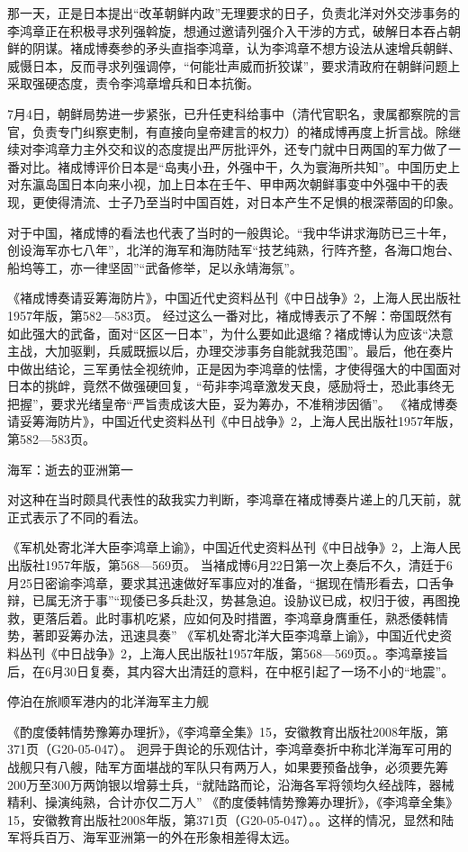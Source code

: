 \documentclass[12pt,UTF8]{ctexbook}
\begin{document}
那一天，正是日本提出“改革朝鲜内政”无理要求的日子，负责北洋对外交涉事务的李鸿章正在积极寻求列强斡旋，想通过邀请列强介入干涉的方式，破解日本吞占朝鲜的阴谋。褚成博奏参的矛头直指李鸿章，认为李鸿章不想方设法从速增兵朝鲜、威慑日本，反而寻求列强调停，“何能壮声威而折狡谋”，要求清政府在朝鲜问题上采取强硬态度，责令李鸿章增兵和日本抗衡。

7月4日，朝鲜局势进一步紧张，已升任吏科给事中（清代官职名，隶属都察院的言官，负责专门纠察吏制，有直接向皇帝建言的权力）的褚成博再度上折言战。除继续对李鸿章力主外交和议的态度提出严厉批评外，还专门就中日两国的军力做了一番对比。褚成博评价日本是“岛夷小丑，外强中干，久为寰海所共知”。中国历史上对东瀛岛国日本向来小视，加上日本在壬午、甲申两次朝鲜事变中外强中干的表现，更使得清流、士子乃至当时中国百姓，对日本产生不足惧的根深蒂固的印象。

对于中国，褚成博的看法也代表了当时的一般舆论。“我中华讲求海防已三十年，创设海军亦七八年”，北洋的海军和海防陆军“技艺纯熟，行阵齐整，各海口炮台、船坞等工，亦一律坚固”“武备修举，足以永靖海氛”。

《褚成博奏请妥筹海防片》，中国近代史资料丛刊《中日战争》2，上海人民出版社1957年版，第582—583页。
经过这么一番对比，褚成博表示了不解：帝国既然有如此强大的武备，面对“区区一日本”，为什么要如此退缩？褚成博认为应该“决意主战，大加驱剿，兵威既振以后，办理交涉事务自能就我范围”。最后，他在奏片中做出结论，三军勇怯全视统帅，正是因为李鸿章的怯懦，才使得强大的中国面对日本的挑衅，竟然不做强硬回复，“苟非李鸿章激发天良，感励将士，恐此事终无把握”，要求光绪皇帝“严旨责成该大臣，妥为筹办，不准稍涉因循”。 《褚成博奏请妥筹海防片》，中国近代史资料丛刊《中日战争》2，上海人民出版社1957年版，第582—583页。

海军：逝去的亚洲第一

对这种在当时颇具代表性的敌我实力判断，李鸿章在褚成博奏片递上的几天前，就正式表示了不同的看法。

《军机处寄北洋大臣李鸿章上谕》，中国近代史资料丛刊《中日战争》2，上海人民出版社1957年版，第568—569页。
当褚成博6月22日第一次上奏后不久，清廷于6月25日密谕李鸿章，要求其迅速做好军事应对的准备，“据现在情形看去，口舌争辩，已属无济于事”“现倭已多兵赴汉，势甚急迫。设胁议已成，权归于彼，再图挽救，更落后着。此时事机吃紧，应如何及时措置，李鸿章身膺重任，熟悉倭韩情势，著即妥筹办法，迅速具奏” 《军机处寄北洋大臣李鸿章上谕》，中国近代史资料丛刊《中日战争》2，上海人民出版社1957年版，第568—569页。。李鸿章接旨后，在6月30日复奏，其内容大出清廷的意料，在中枢引起了一场不小的“地震”。


停泊在旅顺军港内的北洋海军主力舰

《酌度倭韩情势豫筹办理折》，《李鸿章全集》15，安徽教育出版社2008年版，第371页（G20-05-047）。
迥异于舆论的乐观估计，李鸿章奏折中称北洋海军可用的战舰只有八艘，陆军方面堪战的军队只有两万人，如果要预备战争，必须要先筹200万至300万两饷银以增募士兵，“就陆路而论，沿海各军将领均久经战阵，器械精利、操演纯熟，合计亦仅二万人” 《酌度倭韩情势豫筹办理折》，《李鸿章全集》15，安徽教育出版社2008年版，第371页（G20-05-047）。。这样的情况，显然和陆军将兵百万、海军亚洲第一的外在形象相差得太远。
\end{document}
